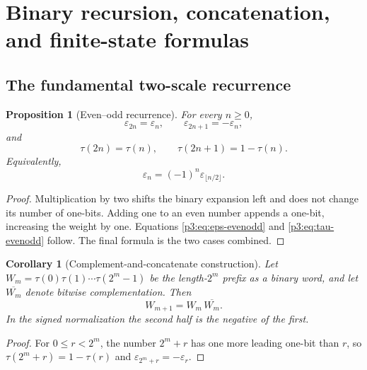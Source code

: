 \documentclass[11pt,oneside]{article}
\newtheorem{proposition}[theorem]{Proposition}
\newtheorem{corollary}[theorem]{Corollary}
\theoremstyle{definition}
\theoremstyle{remark}
\newcommand{\eps}{\varepsilon}
\newcommand{\1}{\mathbf 1}
\begin{document}
\section{Binary recursion, concatenation, and finite-state formulas}
\label{p3:sec:binary}

\subsection{The fundamental two-scale recurrence}

\begin{proposition}[Even--odd recurrence]
\label{p3:prop:evenodd}
For every \(n\ge0\),
\begin{equation}
 \eps_{2n}=\eps_n,
 \qquad
 \eps_{2n+1}=-\eps_n,
 \label{p3:eq:eps-evenodd}
\end{equation}
and
\begin{equation}
 \tau(2n)=\tau(n),
 \qquad
 \tau(2n+1)=1-\tau(n).
 \label{p3:eq:tau-evenodd}
\end{equation}
Equivalently,
\begin{equation}
 \eps_n=(-1)^n\eps_{\lfloor n/2\rfloor}.
 \label{p3:eq:one-line-recursion}
\end{equation}
\end{proposition}

\begin{proof}
Multiplication by two shifts the binary expansion left and does not change its number of
one-bits.  Adding one to an even number appends a one-bit, increasing the weight by one.
Equations \eqref{p3:eq:eps-evenodd} and \eqref{p3:eq:tau-evenodd} follow.  The final formula is the
two cases combined.
\end{proof}

\begin{corollary}[Complement-and-concatenate construction]
\label{p3:cor:morphism}
Let \(W_m=\tau(0)\tau(1)\cdots\tau(2^m-1)\) be the length-\(2^m\) prefix as a binary word,
and let \(\overline{W_m}\) denote bitwise complementation.  Then
\begin{equation}
 W_{m+1}=W_m\,\overline{W_m}.
 \label{p3:eq:morphism-concat}
\end{equation}
In the signed normalization the second half is the negative of the first.
\end{corollary}

\begin{proof}
For \(0\le r<2^m\), the number \(2^m+r\) has one more leading one-bit than \(r\), so
\(\tau(2^m+r)=1-\tau(r)\) and \(\eps_{2^m+r}=-\eps_r\).
\end{proof}
\end{document}
